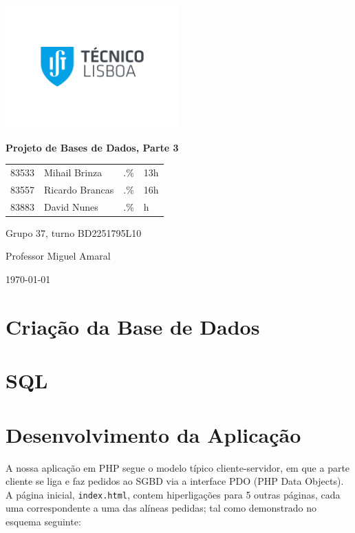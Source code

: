 \documentclass[a4paper]{article}
\begin{document}
    \begin{titlepage}
        \centering
        \includegraphics[width=0.5\textwidth]{IST_A_CMYK_POS.pdf}\par
        {\huge\bfseries Projeto de Bases de Dados, Parte 3\par}
        \vspace{2cm}
        {
        \Large
        \begin{tabular}{llll}
            83533 & Mihail Brinza & .\% & 13h \\
            83557 & Ricardo Brancas & .\% & 16h \\
            83883 & David Nunes & .\% & h
        \end{tabular}
        }
        \vfill
        \large
        Grupo 37, turno BD2251795L10 \par
        Professor Miguel Amaral

        \vspace{3cm}

        {\normalsize \today\par}
    \end{titlepage}

    \section{Criação da Base de Dados}
    

    \section{SQL}
    

    \section{Desenvolvimento da Aplicação}
    A nossa aplicação em PHP segue o modelo típico cliente-servidor, em que a parte cliente se liga e faz pedidos ao SGBD
    via a interface PDO (PHP Data Objects).
    A página inicial, \texttt{index.html}, contem hiperligações para 5 outras páginas, cada uma correspondente
    a uma das alíneas pedidas; tal como demonstrado no esquema seguinte:
\end{document}
